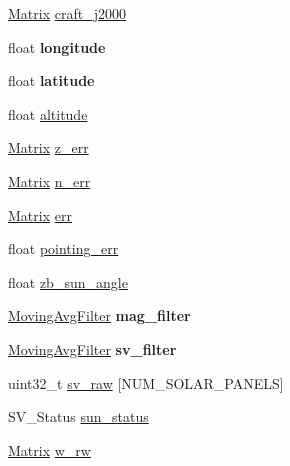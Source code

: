 \begin{DoxyCompactItemize}
\item 
\mbox{\hyperlink{struct___matrix}{Matrix}} \mbox{\hyperlink{struct_a_c_s_type_acc172ef9300af5fed7b539c0ff77d675}{craft\+\_\+j2000}}
\item 
\mbox{\label{struct_a_c_s_type_a006303577d6adb772761727538b74f80}} 
float {\bfseries longitude}
\item 
\mbox{\label{struct_a_c_s_type_ad9e643bc6bd5a62b9b5011cf1c93629e}} 
float {\bfseries latitude}
\item 
float \mbox{\hyperlink{struct_a_c_s_type_a0e13a4b4ae0cefdac2a413284239caa6}{altitude}}
\item 
\mbox{\hyperlink{struct___matrix}{Matrix}} \mbox{\hyperlink{struct_a_c_s_type_a36a617bb19a1c9a4cc9397c8c7775b6c}{z\+\_\+err}}
\item 
\mbox{\hyperlink{struct___matrix}{Matrix}} \mbox{\hyperlink{struct_a_c_s_type_af580c1b977603405c4a17645652865fc}{n\+\_\+err}}
\item 
\mbox{\hyperlink{struct___matrix}{Matrix}} \mbox{\hyperlink{struct_a_c_s_type_a1dbe9014e616749d7c55f3ba4cbbff65}{err}}
\item 
float \mbox{\hyperlink{struct_a_c_s_type_a4c6fe6211cef14e0d66f51e5aff2c485}{pointing\+\_\+err}}
\item 
float \mbox{\hyperlink{struct_a_c_s_type_acb3d9d99bee55edb832182dae3b2d7fd}{zb\+\_\+sun\+\_\+angle}}
\item 
\mbox{\label{struct_a_c_s_type_a6da164cee579fbc7ca61e787ca148475}} 
\mbox{\hyperlink{struct___moving_avg_filter}{Moving\+Avg\+Filter}} {\bfseries mag\+\_\+filter}
\item 
\mbox{\label{struct_a_c_s_type_ae1e2a82621824ccb4bc27eb3dc76c924}} 
\mbox{\hyperlink{struct___moving_avg_filter}{Moving\+Avg\+Filter}} {\bfseries sv\+\_\+filter}
\item 
uint32\+\_\+t \mbox{\hyperlink{struct_a_c_s_type_af83838a9c78e0c708fc7ce4b95e4609d}{sv\+\_\+raw}} \mbox{[}N\+U\+M\+\_\+\+S\+O\+L\+A\+R\+\_\+\+P\+A\+N\+E\+LS\mbox{]}
\item 
S\+V\+\_\+\+Status \mbox{\hyperlink{struct_a_c_s_type_a08e060b8d3806d1da157f82ff6ef89c0}{sun\+\_\+status}}
\item 
\mbox{\hyperlink{struct___matrix}{Matrix}} \mbox{\hyperlink{struct_a_c_s_type_a880b6eef6382841a030de56f08f7c234}{w\+\_\+rw}}

\end{DoxyCompactItemize}
